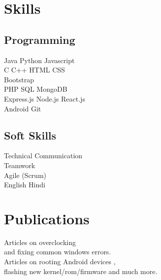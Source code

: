 \documentclass[]{deedy-resume-openfont}
\begin{document}
\begin{minipage}[t]{0.33\textwidth}

\section{Skills}
\subsection{Programming}
Java \textbullet{} Python \textbullet{} Javascript \\
C \textbullet{} C++ \textbullet{} HTML \textbullet{} CSS \\
Bootstrap \\ 
PHP \textbullet{} SQL \textbullet{} MongoDB \\ Express.js \textbullet{} Node.js \textbullet{} React.js \\
Android \textbullet{} Git 
\sectionsep

\subsection{Soft Skills}
Technical Communication\\
Teamwork \\
Agile (Scrum)\\
English \textbullet{} Hindi\\
\sectionsep


\section{Publications} 
\textbullet{} Articles on overclocking \\
and fixing common windows errors. \\
\textbullet{} Articles on rooting Android devices ,\\flashing new kernel/rom/firmware and much more.
\sectionsep

%
%

\end{minipage} 
\hfill
\end{document}

